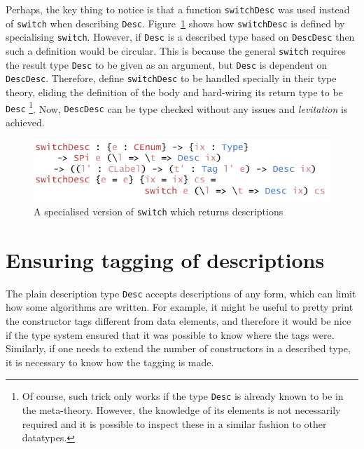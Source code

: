 \documentclass{ituthesis}
\newcommand{\tttype}[1]{\textcolor{type-color}{\texttt{#1}}}
\newcommand{\ttdec}[1]{\textcolor{declared-var-color}{\texttt{#1}}}
\theoremstyle{break}
\begin{document}
Perhaps, the key thing to notice is that a function \ttdec{switchDesc} was used instead of \ttdec{switch} when describing \tttype{Desc}.
Figure~\ref{fig:switchdesc} shows how \ttdec{switchDesc} is defined by specialising \ttdec{switch}. However, if \tttype{Desc} is a described type based on \ttdec{DescDesc} then such a definition would be circular.
This is because the general \ttdec{switch} requires the result type \tttype{Desc} to be given as an argument, but \tttype{Desc} is dependent on \ttdec{DescDesc}. Therefore, \textcite{Chapman:2010:GAL:1863543.1863547} define \ttdec{switchDesc} to be handled specially in their type theory, eliding the definition of the body
and hard-wiring its return type to be \tttype{Desc}
\footnote{Of course, such trick only works if the type \tttype{Desc} is already known to be in the meta-theory.
However, the knowledge of its elements is not necessarily required and it is possible to inspect these in a similar fashion to other datatypes.}.
Now, \ttdec{DescDesc} can be type checked without any issues and \textit{levitation} is achieved.

\begin{figure}[H]
\begin{center}
    \includegraphics[scale=0.5]{Figures/AConstructiveChoiceDesc.png}
\end{center}
\caption{A specialised version of \ttdec{switch} which returns descriptions}
\label{fig:switchdesc}
\end{figure}

\section{Ensuring tagging of descriptions}
\label{sec:Ensuring tagging of descriptions}
The plain description type \tttype{Desc} accepts descriptions of any form, which can limit how some algorithms are written.
For example, it might be useful to pretty print the constructor tags different from data elements, and therefore it would be nice if the type system ensured
that it was possible to know where the tags were.
Similarly, if one needs to extend the number of constructors in a described type, it is necessary to know how the tagging is made.
\end{document}
